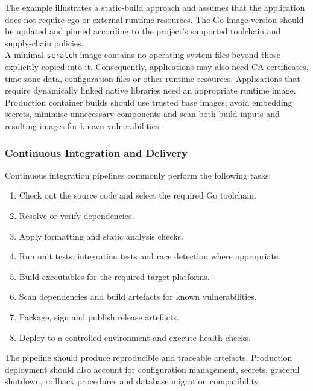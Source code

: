 The example illustrates a static-build approach and assumes that the application does not require cgo or external runtime resources. The Go image version should be updated and pinned according to the project's supported toolchain and supply-chain policies.\\

A minimal \texttt{scratch} image contains no operating-system files beyond those explicitly copied into it. Consequently, applications may also need CA certificates, time-zone data, configuration files or other runtime resources. Applications that require dynamically linked native libraries need an appropriate runtime image.\\

Production container builds should use trusted base images, avoid embedding secrets, minimise unnecessary components and scan both build inputs and resulting images for known vulnerabilities.

\subsubsection{Continuous Integration and Delivery}

Continuous integration pipelines commonly perform the following tasks:

\begin{enumerate}
    \item Check out the source code and select the required Go toolchain.
    \item Resolve or verify dependencies.
    \item Apply formatting and static analysis checks.
    \item Run unit tests, integration tests and race detection where appropriate.
    \item Build executables for the required target platforms.
    \item Scan dependencies and build artefacts for known vulnerabilities.
    \item Package, sign and publish release artefacts.
    \item Deploy to a controlled environment and execute health checks.
\end{enumerate}

The pipeline should produce reproducible and traceable artefacts. Production deployment should also account for configuration management, secrets, graceful shutdown, rollback procedures and database migration compatibility.\\

